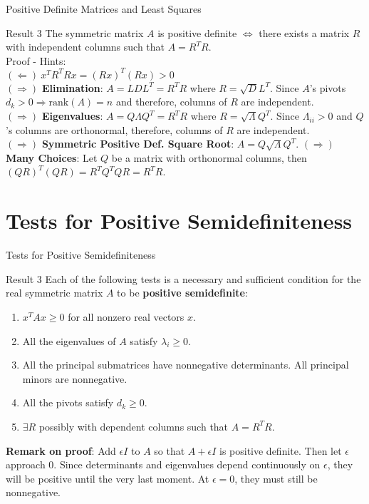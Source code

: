 \documentclass{beamer}
\begin{document}
\begin{frame}{Positive Definite Matrices and Least Squares}{}
\begin{block}{Result 3}
The symmetric matrix $A$ is positive definite $\iff$ there exists a matrix $R$ with independent columns such that $A = R^TR$.\\
Proof - Hints:\\
$\mathbf{(\Leftarrow)}\ x^TR^TRx = (Rx)^T(Rx) > 0$\\
$\mathbf{(\Rightarrow)}$ \textbf{Elimination}: $A = LDL^T = R^TR$ where $R = \sqrt{D}L^T$. Since $A$'s pivots $d_k > 0 \Rightarrow \text{rank}(A) = n$ and therefore, columns of $R$ are independent.\\
$\mathbf{(\Rightarrow)}$ \textbf{Eigenvalues}: $A = Q\Lambda Q^T = R^TR$ where $R = \sqrt{\Lambda}Q^T$. Since $\Lambda_{ii} > 0$ and $Q$'s columns are orthonormal, therefore, columns of $R$ are independent.\\
$\mathbf{(\Rightarrow)}$ \textbf{Symmetric Positive Def. Square Root}: $A = Q\sqrt{\Lambda}Q^T$.
$\mathbf{(\Rightarrow)}$ \textbf{Many Choices}: Let $Q$ be a matrix with orthonormal columns, then $(QR)^T(QR) = R^TQ^TQR = R^TR$.
\end{block}
\end{frame}

\section{Tests for Positive Semidefiniteness}

\begin{frame}{Tests for Positive Semidefiniteness}{}
\begin{block}{Result 3}
Each of the following tests is a necessary and sufficient condition for the real symmetric matrix $A$ to be \textbf{positive semidefinite}:
\begin{enumerate}
    \item $x^TAx \geq 0$ for all nonzero real vectors $x$.
    \item All the eigenvalues of $A$ satisfy $\lambda_i \geq 0$.
    \item All the principal submatrices have nonnegative determinants. All principal minors are nonnegative.
    \item All the pivots satisfy $d_k \geq 0$.
    \item $\exists R$ possibly with dependent columns such that $A=R^TR$.
\end{enumerate}
\end{block}
\textbf{Remark on proof}: \small{Add $\epsilon I$ to $A$ so that $A+\epsilon I$ is positive definite. Then let $\epsilon$ approach $0$. Since determinants and eigenvalues depend continuously on $\epsilon$, they will be positive until the very last moment. At $\epsilon = 0$, they must still be nonnegative.}
\end{frame}
\end{document}

